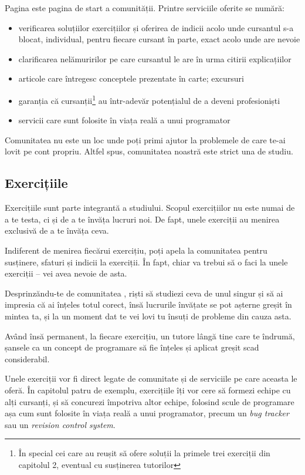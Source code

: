 Pagina {\phpro} este pagina de start a comunității. Printre serviciile oferite se numără:
\begin{itemize}
	\item verificarea soluțiilor exercițiilor și oferirea de indicii acolo unde cursantul s-a blocat, individual,
pentru fiecare cursant în parte, exact acolo unde are nevoie
	\item clarificarea nelămuririlor pe care cursantul le are în urma citirii explicațiilor
	\item articole care întregesc conceptele prezentate în carte; excursuri
	\item garanția că cursanții\footnote{În special cei care au reușit
să ofere soluții la primele trei exerciții din capitolul 2, eventual cu susținerea
tutorilor} au într-adevăr potențialul de a deveni profesioniști
	\item servicii care sunt folosite în viața reală a unui programator
\end{itemize}

Comunitatea {\phpro} nu este un loc unde poți primi ajutor la
problemele de care te-ai lovit pe cont propriu. Altfel spus, comunitatea
noastră este strict una de studiu.

{}
\subsection*{Exercițiile}

Exercițiile sunt parte integrantă a studiului. Scopul exercițiilor nu
este numai de a te testa, ci și de a te învăța lucruri noi. De fapt,
unele exerciții au menirea exclusivă de a te învăța ceva.

Indiferent de menirea fiecărui exercițiu, poți apela la comunitatea
{\phpro} pentru susținere, sfaturi și indicii la exerciții. În fapt,
chiar va trebui să o faci la unele exerciții -- vei avea nevoie de asta.

Desprinzăndu-te de comunitatea \phpro, riști să studiezi ceva de unul
singur și să ai impresia că ai înțeles totul corect, însă lucrurile învățate
se pot așterne greșit în mintea ta, și la un moment dat te vei lovi
tu însuți de probleme din cauza asta.

Având însă permanent, la fiecare exercițiu, un tutore lângă tine care te
îndrumă, șansele ca un concept de programare să fie înțeles și aplicat
greșit scad considerabil.

Unele exerciții vor fi direct legate de comunitate și de serviciile pe care
aceasta le oferă. În capitolul patru de exemplu, exercițiile îți vor 
cere să formezi echipe cu alți cursanți, și să concurezi împotriva altor echipe, folosind
scule de programare așa cum sunt folosite în viața reală a unui programator,
precum un \textsl{bug tracker} sau un \textsl{revision control system}.

